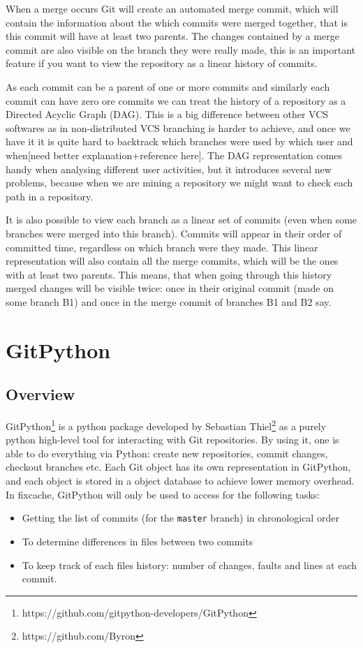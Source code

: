 \documentclass[12pt,twoside,notitlepage]{report}
\begin{document}
When a merge occurs Git will create an automated merge commit, which will contain the information about the which commits were merged together, that is this commit will have at least two parents. The changes contained by a merge commit are also visible on the branch they were really made, this is an important feature if you want to view the repository as a linear history of commits. 

As each commit can be a parent of one or more commits and similarly each commit can have zero ore commits we can treat the history of a repository as a Directed Acyclic Graph (DAG). This is a big difference between other VCS softwares as in non-distributed VCS branching is harder to achieve, and once we have it it is quite hard to backtrack which branches were used by which user and when[need better explanation+reference here]. The DAG representation comes handy when analysing different user activities, but it introduces several new problems, because when we are mining a repository we might want to check each path in a repository. 

It is also possible to view each branch as a linear set of commits (even when some branches were merged into this branch). Commits will appear in their order of committed time, regardless on which branch were they made. This linear representation will also contain all the merge commits, which will be the ones with at least two parents. This means, that when going through this history merged changes will be visible twice: once in their original commit (made on some branch B1) and once in the merge commit of branches B1 and B2 say.
\section{GitPython}

\subsection{Overview}
GitPython\footnote{https://github.com/gitpython-developers/GitPython} is a python package developed by Sebastian Thiel\footnote{https://github.com/Byron} as a purely python high-level tool for interacting with Git repositories. By using it, one is able to do everything via Python: create new repositories, commit changes, checkout branches etc. Each Git object has its own representation in GitPython, and each object is stored in a object database to achieve lower memory overhead. In fixcache, GitPython will only be used to access for the following tasks:
\begin{itemize}
\item Getting the list of commits (for the \texttt{master} branch) in chronological order
\item To determine differences in files between two commits
\item To keep track of each files history: number of changes, faults and lines at each commit.
\end{itemize}
\end{document}
